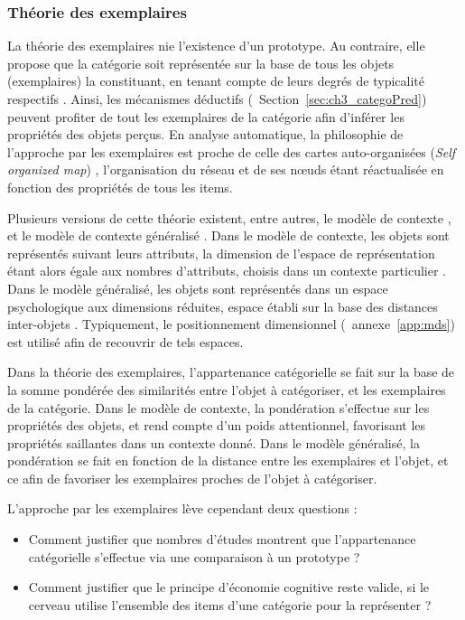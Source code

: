 \subsubsection{Théorie des exemplaires}

La théorie des exemplaires nie l'existence d'un prototype. Au contraire, elle propose que la catégorie soit représentée sur la base de tous les objets (exemplaires) la constituant, en tenant compte de leurs degrés de typicalité respectifs \citep{medin1978context,nosofsky1986attention,nosofsky1992similarity}. Ainsi, les mécanismes déductifs (\cf~Section~\ref{sec:ch3_categoPred}) peuvent profiter de tout les exemplaires de la catégorie afin d'inférer les propriétés des objets perçus. En analyse automatique, la philosophie de l'approche par les exemplaires est proche de celle des cartes auto-organisées (\emph{Self organized map}) \citep{kohonen1995som}, l’organisation du réseau et de ses nœuds étant réactualisée en fonction des propriétés de tous les items.

Plusieurs versions de cette théorie existent, entre autres, le modèle de contexte \citep{medin1978context}, et le modèle de contexte généralisé \citep{nosofsky1986attention}. Dans le modèle de contexte, les objets sont représentés suivant leurs attributs, la dimension de l'espace de représentation étant alors égale aux nombres d'attributs, choisis dans un contexte particulier \citep{hitzman1986schema}. Dans le modèle généralisé, les objets sont représentés dans un espace psychologique aux dimensions réduites, espace établi sur la base des distances inter-objets \citep{nosofsky1992similarity}. Typiquement, le positionnement dimensionnel (\cf~annexe~\ref{app:mds}) est utilisé afin de recouvrir de tels espaces.

Dans la théorie des exemplaires, l'appartenance catégorielle se fait sur la base de la somme pondérée des similarités entre l'objet à catégoriser, et les exemplaires de la catégorie. Dans le modèle de contexte, la pondération s'effectue sur les propriétés des objets, et rend compte d'un poids attentionnel, favorisant les propriétés saillantes dans un contexte donné. Dans le modèle généralisé, la pondération se fait en fonction de la distance entre les exemplaires et l’objet, et ce afin de favoriser les exemplaires proches de l'objet à catégoriser.

L'approche par les exemplaires lève cependant deux questions \citep{goldstone2003concepts}:

\begin{itemize}
\item Comment justifier que nombres d'études montrent que l'appartenance catégorielle s'effectue via une comparaison à un prototype ?
\item Comment justifier que le principe d'économie cognitive reste valide, si le cerveau utilise l'ensemble des items d'une catégorie pour la représenter ? 
\end{itemize}

